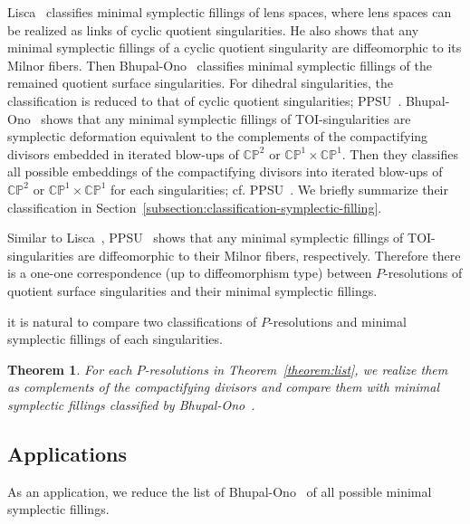\documentclass[reqno, twoside, a4paper]{amsart}
\newtheorem{theorem}{Theorem}[section]
\theoremstyle{definition}
\numberwithin{equation}{section}
\begin{document}
Lisca~\cite{Lisca-2008} classifies minimal symplectic fillings of lens spaces, where lens spaces can be realized as links of cyclic quotient singularities. He also shows that any minimal symplectic fillings of a cyclic quotient singularity are diffeomorphic to its Milnor fibers. Then Bhupal-Ono~\cite{Bhupal-Ono-2012} classifies minimal symplectic fillings of the remained quotient surface singularities. For dihedral singularities, the classification is reduced to that of cyclic quotient singularities; PPSU~\cite{PPSU-2015}. Bhupal-Ono~\cite{Bhupal-Ono-2012} shows that any minimal symplectic fillings of TOI-singularities are symplectic deformation equivalent to the complements of the compactifying divisors embedded in iterated blow-ups of  $\mathbb{CP}^2$ or $\mathbb{CP}^1 \times \mathbb{CP}^1$. Then they classifies all possible embeddings of the compactifying divisors into iterated blow-ups of  $\mathbb{CP}^2$ or $\mathbb{CP}^1 \times \mathbb{CP}^1$ for each singularities; cf. PPSU~\cite[Remark 4.13]{PPSU-2015}. We briefly summarize their classification in Section~\ref{subsection:classification-symplectic-filling}.

Similar to Lisca~\cite{Lisca-2008}, PPSU~\cite{PPSU-2015} shows that any minimal symplectic fillings of TOI-singularities are diffeomorphic to their Milnor fibers, respectively. Therefore there is a one-one correspondence (up to diffeomorphism type) between $P$-resolutions of quotient surface singularities and their minimal symplectic fillings.

it is natural to compare two classifications of $P$-resolutions and minimal symplectic fillings of each singularities.

\begin{theorem}
\label{theorem:complement}
For each $P$-resolutions in Theorem~\ref{theorem:list}, we realize them as complements of the compactifying divisors and compare them with minimal symplectic fillings classified by Bhupal-Ono~\cite[\S5]{Bhupal-Ono-2012}.
\end{theorem}






\subsection{Applications}

As an application, we reduce the list of Bhupal-Ono~\cite{Bhupal-Ono-2012} of all possible minimal symplectic fillings.
\end{document}
